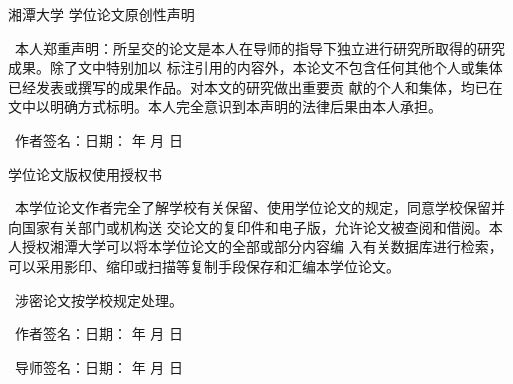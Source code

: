 ﻿%
\thispagestyle{empty}
\begin{center}
    {\heiti{}湘潭大学 \vskip5mm 学位论文原创性声明}
\end{center}
\songti{}

    ~本人郑重声明：所呈交的论文是本人在导师的指导下独立进行研究所取得的研究成果。除了文中特别加以
标注引用的内容外，本论文不包含任何其他个人或集体已经发表或撰写的成果作品。对本文的研究做出重要贡
献的个人和集体，均已在文中以明确方式标明。本人完全意识到本声明的法律后果由本人承担。
\vskip8mm

    ~作者签名：\hfill                          日期：\kern 1.6cm 年 \kern 0.8cm 月 \kern 0.8cm 日
\vskip30mm
\begin{center}
    {\heiti{}学位论文版权使用授权书}
\end{center}

    ~本学位论文作者完全了解学校有关保留、使用学位论文的规定，同意学校保留并向国家有关部门或机构送
交论文的复印件和电子版，允许论文被查阅和借阅。本人授权湘潭大学可以将本学位论文的全部或部分内容编
入有关数据库进行检索，可以采用影印、缩印或扫描等复制手段保存和汇编本学位论文。
\par
    ~涉密论文按学校规定处理。
\vskip30mm

    ~作者签名：\hfill                         日期：\kern 1.6cm 年 \kern 0.8cm 月 \kern 0.8cm 日
\vskip8mm

    ~导师签名：\hfill                         日期：\kern 1.6cm 年 \kern 0.8cm 月 \kern 0.8cm 日